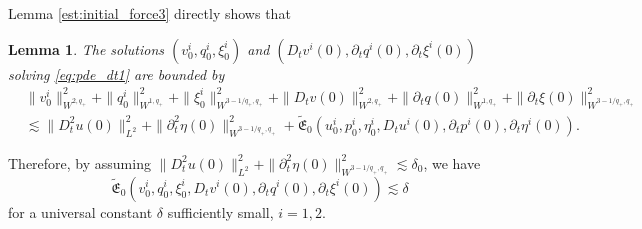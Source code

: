 \documentclass[letterpaper,reqno,10pt,twoside]{amsart}
\newtheorem{lemma}[theorem]{Lemma}
\theoremstyle{definition}
\theoremstyle{remark}
\def\p{\partial}
\begin{document}
\begin{appendix}
			
			Lemma  \ref{est:initial_force3} directly shows that
			\begin{lemma}
				The solutions $(v^i_0, q^i_0, \xi^i_0)$ and $(D_tv^i(0), \p_tq^i(0), \p_t\xi^i(0))$ solving \eqref{eq:pde_dt1} are bounded by
				\[
				\begin{aligned}
					&\|v_0^i\|_{W^{2, q_+}}^2+\|q_0^i\|_{W^{1, q_+}}^2+\|\xi_0^i\|_{W^{3-1/q_+, q_+}}^2+\|D_tv(0)\|_{W^{2, q_+}}^2+\|\p_tq(0)\|_{W^{1, q_+}}^2+\|\p_t\xi(0)\|_{W^{3-1/q_+, q_+}}^2\\
					&\lesssim \|D_t^2u(0)\|_{L^2}^2+\|\p_t^2\eta(0)\|_{W^{3-1/q_+, q_+}}^2+\widetilde{\mathfrak{E}}_0(u_0^i,p_0^i,\eta_0^i, D_tu^i(0),\p_tp^i(0),\p_t\eta^i(0)).
				\end{aligned}
				\]
			\end{lemma}
			Therefore, by assuming $\|D_t^2u(0)\|_{L^2}^2+\|\p_t^2\eta(0)\|_{W^{3-1/q_+, q_+}}^2\lesssim \delta_0$, we have
			\begin{equation}\label{eq:small_initial}
				\widetilde{\mathfrak{E}}_0(v_0^i,q_0^i,\xi_0^i, D_tv^i(0),\p_tq^i(0),\p_t\xi^i(0))\lesssim \delta
			\end{equation}
			for a universal constant $\delta$ sufficiently small, $i=1, 2$.
			

\end{appendix}
\end{document}
